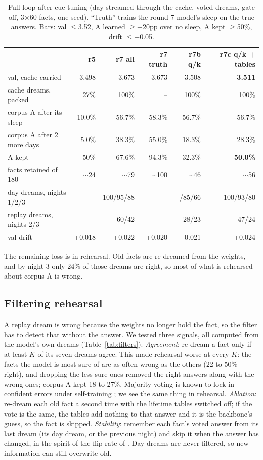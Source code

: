\documentclass[11pt]{article}
\begin{document}
\begin{table}[t]\centering\small
\caption{Full loop after cue tuning (day streamed through the cache, voted
dreams, gate off, 3$\times$60 facts, one seed). ``Truth'' trains the round-7
model's sleep on the true answers. Bars: val $\leq$3.52, A learned $\geq$+20pp
over no sleep, A kept $\geq$50\%, drift $\leq$+0.05.}\label{tab:cuetune}
\begin{tabular}{lrrrrr}\toprule
& r5 & r7 all & r7 truth & r7b q/k & r7c q/k + tables\\\midrule
val, cache carried & 3.498 & 3.673 & 3.673 & 3.508 & \textbf{3.511}\\
cache dreams, packed & 27\% & 100\% & -- & 100\% & 100\%\\
corpus A after its sleep & 10.0\% & 56.7\% & 58.3\% & 56.7\% & 56.7\%\\
corpus A after 2 more days & 5.0\% & 38.3\% & 55.0\% & 18.3\% & 28.3\%\\
A kept & 50\% & 67.6\% & 94.3\% & 32.3\% & \textbf{50.0\%}\\
facts retained of 180 & $\sim$24 & $\sim$79 & $\sim$100 & $\sim$46 & $\sim$56\\
day dreams, nights 1/2/3 & & 100/95/88 & -- & --/85/66 & 100/93/80\\
replay dreams, nights 2/3 & & 60/42 & -- & 28/23 & 47/24\\
val drift & +0.018 & +0.022 & +0.020 & +0.021 & +0.024\\\bottomrule
\end{tabular}\end{table}

The remaining loss is in rehearsal. Old facts are re-dreamed from the weights,
and by night 3 only 24\% of those dreams are right, so most of what is rehearsed
about corpus A is wrong.

\subsection{Filtering rehearsal}
\label{sec:filters}
A replay dream is wrong because the weights no longer hold the fact, so the
filter has to detect that without the answer. We tested three signals, all
computed from the model's own dreams (Table~\ref{tab:filters}).
\emph{Agreement}: re-dream a fact only if at least $K$ of its seven dreams
agree. This made rehearsal worse at every $K$: the facts the model is most sure
of are as often wrong as the others (22 to 50\% right), and dropping the less
sure ones removed the right answers along with the wrong ones; corpus A kept 18
to 27\%. Majority voting is known to lock in confident errors under
self-training \citep{lin2026extinction}; we see the same thing in rehearsal.
\emph{Ablation}: re-dream each old fact a second time with the lifetime tables
switched off; if the vote is the same, the tables add nothing to that answer and
it is the backbone's guess, so the fact is skipped. \emph{Stability}: remember
each fact's voted answer from its last dream (its day dream, or the previous
night) and skip it when the answer has changed, in the spirit of the flip rate
of \citet{lin2026extinction}. Day dreams are never filtered, so new information
can still overwrite old.
\end{document}
